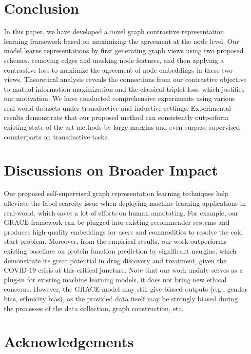 \documentclass{article}
\theoremstyle{remark}
\begin{document}
 \section{Conclusion}

In this paper, we have developed a novel graph contrastive representation learning framework based on maximizing the agreement at the node level. Our model learns representations by first generating graph views using two proposed schemes, removing edges and masking node features, and then applying a contrastive loss to maximize the agreement of node embeddings in these two views. Theoretical analysis reveals the connections from our contrastive objective to mutual information maximization and the classical triplet loss, which justifies our motivation. We have conducted comprehensive experiments using various real-world datasets under transductive and inductive settings. Experimental results demonstrate that our proposed method can consistently outperform existing state-of-the-art methods by large margins and even surpass supervised counterparts on transductive tasks.
 \section*{Discussions on Broader Impact}

Our proposed self-supervised graph representation learning techniques help alleviate the label scarcity issue when deploying machine learning applications in real-world, which saves a lot of efforts on human annotating.
For example, our GRACE framework can be plugged into existing recommender systems and produces high-quality embeddings for users and commodities to resolve the cold start problem.
Moreover, from the empirical results, our work outperforms existing baselines on protein function prediction by significant margins, which demonstrate its great potential in drug discovery and treatment, given the COVID-19 crisis at this critical juncture.
Note that our work mainly serves as a plug-in for existing machine learning models, it does not bring new ethical concerns.
However, the GRACE model may still give biased outputs (e.g., gender bias, ethnicity bias), as the provided data itself may be strongly biased during the processes of the data collection, graph construction, etc.

\section*{Acknowledgements}
\end{document}
